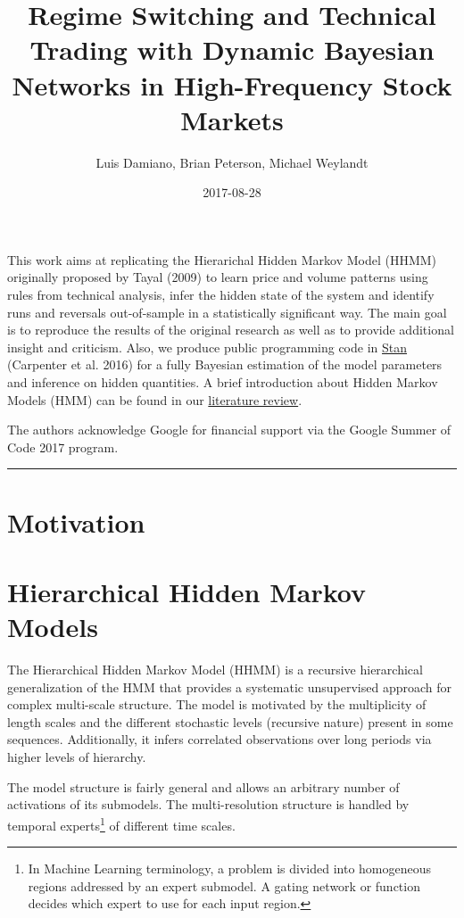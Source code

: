 \documentclass[]{article}
\title{Regime Switching and Technical Trading with Dynamic Bayesian Networks in
High-Frequency Stock Markets}
\author{Luis Damiano, Brian Peterson, Michael Weylandt}
\date{2017-08-28}
\let\rmarkdownfootnote\footnote%
\def\footnote{\protect\rmarkdownfootnote}
\begin{document}
\maketitle

{
\setcounter{tocdepth}{2}
\tableofcontents
}
This work aims at replicating the Hierarichal Hidden Markov Model (HHMM)
originally proposed by Tayal (2009) to learn price and volume patterns
using rules from technical analysis, infer the hidden state of the
system and identify runs and reversals out-of-sample in a statistically
significant way. The main goal is to reproduce the results of the
original research as well as to provide additional insight and
criticism. Also, we produce public programming code in
\href{http://mc-stan.org/}{Stan} (Carpenter et al. 2016) for a fully
Bayesian estimation of the model parameters and inference on hidden
quantities. A brief introduction about Hidden Markov Models (HMM) can be
found in our
\href{https://github.com/luisdamiano/gsoc17-hhmm/blob/master/litreview/main.pdf}{literature
review}.

The authors acknowledge Google for financial support via the Google
Summer of Code 2017 program.

\begin{center}\rule{0.5\linewidth}{\linethickness}\end{center}

\section{Motivation}\label{motivation}

\section{Hierarchical Hidden Markov
Models}\label{hierarchical-hidden-markov-models}

The Hierarchical Hidden Markov Model (HHMM) is a recursive hierarchical
generalization of the HMM that provides a systematic unsupervised
approach for complex multi-scale structure. The model is motivated by
the multiplicity of length scales and the different stochastic levels
(recursive nature) present in some sequences. Additionally, it infers
correlated observations over long periods via higher levels of
hierarchy.

The model structure is fairly general and allows an arbitrary number of
activations of its submodels. The multi-resolution structure is handled
by temporal experts\footnote{In Machine Learning terminology, a problem
  is divided into homogeneous regions addressed by an expert submodel. A
  gating network or function decides which expert to use for each input
  region.} of different time scales.
\end{document}
